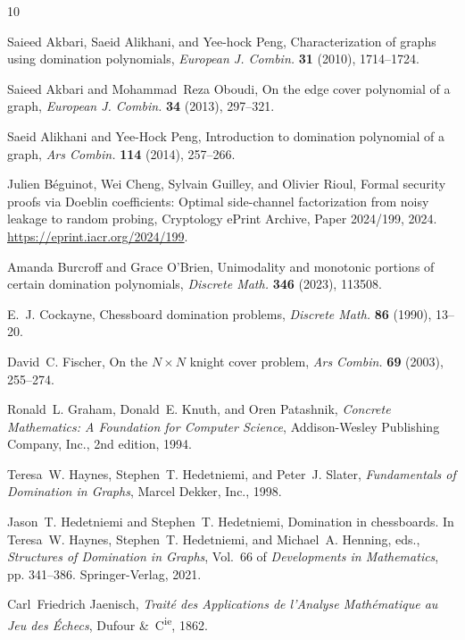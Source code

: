 \documentclass[12pt,reqno]{article}
\begin{document}

\begin{thebibliography}{10}

Saieed Akbari, Saeid Alikhani, and Yee-hock Peng, Characterization of graphs
  using domination polynomials, {\em European J. Combin.} {\bf
  31} (2010), 1714--1724.

Saieed Akbari and Mohammad~Reza Oboudi, On the edge cover polynomial of a
  graph, {\em European J. Combin.} {\bf 34} (2013), 297--321.

Saeid Alikhani and Yee-Hock Peng, Introduction to domination polynomial of a
graph, {\em Ars Combin.} {\bf 114} (2014), 257--266.

Julien B{\'e}guinot, Wei Cheng, Sylvain Guilley, and Olivier Rioul, {Formal
  security proofs via Doeblin coefficients: Optimal side-channel factorization
  from noisy leakage to random probing}, Cryptology ePrint Archive, Paper
  2024/199, 2024.
\newblock \url{https://eprint.iacr.org/2024/199}.

Amanda Burcroff and Grace O'Brien, Unimodality and monotonic portions of
  certain domination polynomials, {\em Discrete Math.} {\bf 346}
  (2023), 113508.

E.~J. Cockayne, Chessboard domination problems, {\em Discrete Math.} {\bf
  86} (1990), 13--20.

David~C. Fischer, {On the $N\times N$ knight cover problem}, {\em Ars
  Combin.} {\bf 69} (2003), 255--274.

Ronald~L. Graham, Donald~E. Knuth, and Oren Patashnik, {\em {Concrete
  Mathematics: A Foundation for Computer Science}}, {Addison-Wesley Publishing
  Company, Inc.}, 2nd edition, 1994.

Teresa~W. Haynes, Stephen~T. Hedetniemi, and Peter~J. Slater, {\em
  {Fundamentals of Domination in Graphs}}, Marcel Dekker, Inc., 1998.

Jason~T. Hedetniemi and Stephen~T. Hedetniemi, Domination in chessboards.
\newblock In Teresa~W. Haynes, Stephen~T. Hedetniemi, and Michael~A. Henning,
  eds., {\em Structures of Domination in Graphs}, Vol.~66 of {\em
  Developments in Mathematics}, pp.  341--386. Springer-Verlag, 2021.

Carl~Friedrich Jaenisch, {\em {Trait{\'e} des Applications de l'Analyse
  Math{\'e}matique au Jeu des {\'E}checs}}, {Dufour \&\ C\textsuperscript{ie}},
  1862.


\end{thebibliography}
\end{document}
